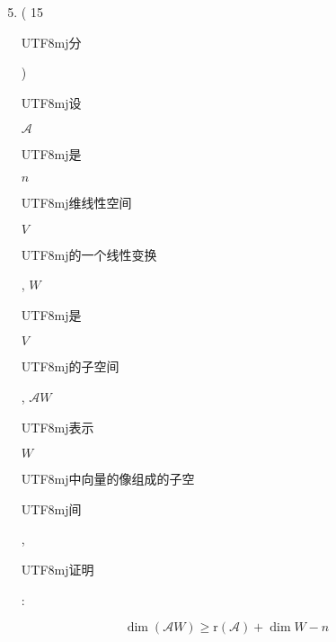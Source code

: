 \documentclass[10pt]{article}
\begin{document}
\begin{enumerate}
  \setcounter{enumi}{4}
  \item ( 15 \begin{CJK}{UTF8}{mj}分\end{CJK}) \begin{CJK}{UTF8}{mj}设\end{CJK} $\mathscr{A}$ \begin{CJK}{UTF8}{mj}是\end{CJK} $n$ \begin{CJK}{UTF8}{mj}维线性空间\end{CJK} $V$ \begin{CJK}{UTF8}{mj}的一个线性变换\end{CJK}, $W$ \begin{CJK}{UTF8}{mj}是\end{CJK} $V$ \begin{CJK}{UTF8}{mj}的子空间\end{CJK}, $\mathscr{A} W$ \begin{CJK}{UTF8}{mj}表示\end{CJK} $W$ \begin{CJK}{UTF8}{mj}中向量的像组成的子空\end{CJK} \begin{CJK}{UTF8}{mj}间\end{CJK}, \begin{CJK}{UTF8}{mj}证明\end{CJK}:
\end{enumerate}
$$
\operatorname{dim}(\mathscr{A} W) \geq \mathrm{r}(\mathscr{A})+\operatorname{dim} W-n
$$
\end{document}
